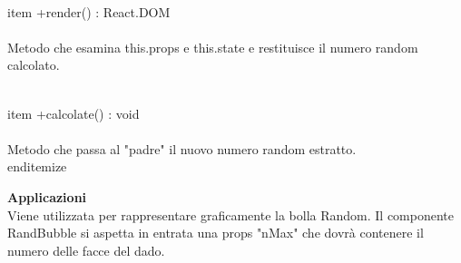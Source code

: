 \\item +render() : React.DOM 
\\\\
Metodo che esamina this.props e this.state e restituisce il numero random calcolato. 

\\item +calcolate() : void \\\\
Metodo che passa al "padre" il nuovo numero random estratto.
\\end{itemize} 


\textbf{Applicazioni}\\
Viene utilizzata per rappresentare graficamente la bolla Random.
Il componente RandBubble si aspetta in entrata una props "nMax" che dovrà contenere il numero delle facce del dado. 


\clearpage


